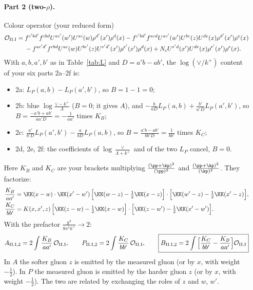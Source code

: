 \paragraph{Part 2 (two-$\rho$).} Colour operator (your reduced form)
\begin{align*}
\mathcal O_{\rm II.I}={}&f^{c'bd'}f^{cbd}U^{ac'}(w')U^{ac}(w)\rho^{d'}(x')\rho^d(x)-f^{c'bd'}f^{acd}U^{ac'}(w')U^{bc}(z)U^{de}(x)\rho^{d'}(x')\rho^e(x)\\
&-f^{ac'd'}f^{cbd}U^{ac}(w)U^{bc'}(z)U^{e'd'}(x')\rho^{e'}(x')\rho^d(x)+N_cU^{e'd}(x')U^{de}(x)\rho^{e'}(x')\rho^e(x).
\end{align*}
With $a,b,a',b'$ as in Table~\ref{tab:L} and $D=a'b-ab'$, the $\log(\vee/k^+)$ content of your six parts 2a--2f is:
\begin{itemize}
\item 2a: $L_P(a,b)-L_P(a',b')$, so $B=1-1=0$;
\item 2b: blue $\log\frac{\vee-k^+}{\Lambda}$ ($B=0$; it gives $A$), and $-\frac{b}{aD}L_P(a,b)+\frac{b'}{a'D}L_P(a',b')$, so $B=\frac{-a'b+ab'}{aa'D}=-\frac{1}{aa'}$ times $K_B$;
\item 2c: $\frac{a'}{b'D}L_P(a',b')-\frac{a}{bD}L_P(a,b)$, so $B=\frac{a'b-ab'}{bb'D}=\frac{1}{bb'}$ times $K_C$;
\item 2d, 2e, 2f: the coefficients of $\log\frac{\vee}{\Lambda+k^+}$ and of the two $L_P$ cancel, $B=0$.
\end{itemize}
Here $K_B$ and $K_C$ are your brackets multiplying $\frac{(\pp+\kp)^2}{(\pp)^2}$ and $\frac{(\pp+\kp)^2}{(\kp)^2}$. They factorize:
\begin{align}
\frac{K_B}{aa'}&=\KK(x-w)\cdot\KK(x'-w')\,\Big[\KK(w-z)-\tfrac12\KK(x-z)\Big]\cdot\Big[\KK(w'-z)-\tfrac12\KK(x'-z)\Big],\notag\\
\frac{K_C}{bb'}&=K(x,x',z)\,\Big[\KK(z-w)-\tfrac12\KK(x-w)\Big]\cdot\Big[\KK(z-w')-\tfrac12\KK(x'-w')\Big].
\end{align}
With the prefactor $\frac{g^4}{8\pi^5k^+}\to2$:
\begin{equation}
A_{\rm II.I,2}=2\int\frac{K_B}{aa'}\,\mathcal O_{\rm II.I},\qquad P_{\rm II.I,2}=2\int\frac{K_C}{bb'}\,\mathcal O_{\rm II.I},\qquad
\boxed{B_{\rm II.I,2}=2\int\Big[\frac{K_C}{bb'}-\frac{K_B}{aa'}\Big]\mathcal O_{\rm II.I}}
\end{equation}
In $A$ the softer gluon $z$ is emitted by the measured gluon (or by $x$, with weight $-\frac12$). In $P$ the measured gluon is emitted by the harder gluon $z$ (or by $x$, with weight $-\frac12$). The two are related by exchanging the roles of $z$ and $w$, $w'$.

